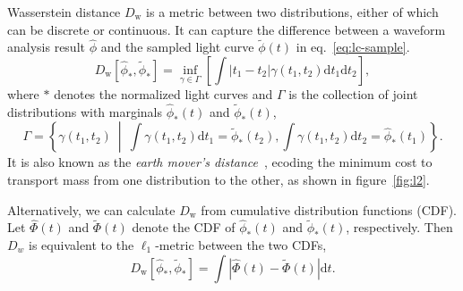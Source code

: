 Wasserstein distance $D_\mathrm{w}$ is a metric between two distributions, either of which can be discrete or continuous. It can capture the difference between a waveform analysis result $\hat{\phi}$ and the sampled light curve $\tilde{\phi}(t)$ in eq.~\eqref{eq:lc-sample}.
\begin{equation}
  D_\mathrm{w}\left[\hat{\phi}_*, \tilde{\phi}_*\right] = \inf_{\gamma \in \Gamma} \left[\int \left\vert t_1 - t_2 \right\vert \gamma(t_1, t_2)\mathrm{d}t_1\mathrm{d}t_2\right],
\end{equation}
where $*$ denotes the normalized light curves and $\Gamma$ is the collection of joint distributions with marginals $\hat{\phi}_*(t)$ and $\tilde{\phi}_*(t)$,
\begin{equation*}
  \label{eq:joint}
  \Gamma = \left\{\gamma(t_1, t_2) ~\middle\vert~ \int\gamma(t_1,t_2)\mathrm{d}t_1 = \tilde{\phi}_*(t_2) , \int\gamma(t_1,t_2)\mathrm{d}t_2 = \hat{\phi}_*(t_1) \right\}.
\end{equation*}
It is also known as the \textit{earth mover's distance}~\cite{levina_earth_2001}, ecoding the minimum cost to transport mass from one distribution to the other, as shown in figure~\ref{fig:l2}.

Alternatively, we can calculate $D_\mathrm{w}$ from cumulative distribution functions (CDF). Let $\hat\Phi(t)$ and $\tilde\Phi(t)$ denote the CDF of $\hat{\phi}_*(t)$ and $\tilde{\phi}_*(t)$, respectively. Then $D_w$ is equivalent to the $\ell_1$-metric between the two CDFs,
\begin{equation}
    D_\mathrm{w}\left[\hat{\phi}_*, \tilde{\phi}_*\right] = \int\left|\hat{\Phi}(t) - \tilde{\Phi}(t)\right| \mathrm{d}t.
    \label{eq:numerical}
\end{equation}